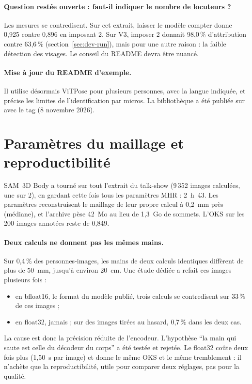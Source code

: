 \documentclass[11pt,a4paper]{report}
\newcommand{\code}[1]{\texttt{\detokenize{#1}}}
\begin{document}
\paragraph{Question restée ouverte : faut-il indiquer le nombre de locuteurs ?} Les mesures se contredisent. Sur cet extrait,
laisser le modèle compter donne 0,925 contre 0,896 en imposant 2. Sur V3, imposer 2 donnait 98,0\,\% d'attribution contre
63,6\,\% (section~\ref{sec:dev-run}), mais pour une autre raison : la faible détection des visages. Le conseil du
README devra être nuancé.

\paragraph{Mise à jour du README d'exemple.} Il utilise désormais ViTPose pour plusieurs personnes, \code{large-v3-turbo} avec
la langue indiquée, et précise les limites de l'identification par micros. La bibliothèque a été publiée sur \code{main} avec
le tag \code{tm-v1-optimisations} (8 novembre 2026).

\section{Paramètres du maillage et reproductibilité}
\label{sec:res-params}

SAM~3D Body a tourné sur tout l'extrait du talk-show (9\,352 images calculées, une sur 2), en gardant cette fois tous les
paramètres MHR : 2~h~43. Les paramètres reconstruisent le maillage de leur propre calcul à 0,2~mm près (médiane), et l'archive pèse
42~Mo au lieu de 1,3~Go de sommets. L'OKS sur les 200 images annotées reste de 0,849.

\paragraph{Deux calculs ne donnent pas les mêmes mains.} Sur 0,4\,\% des personnes-images, les mains de deux calculs identiques
diffèrent de plus de 50~mm, jusqu'à environ 20~cm. Une étude dédiée a refait ces images plusieurs fois :
\begin{itemize}
    \item en bfloat16, le format du modèle publié, trois calculs se contredisent sur 33\,\% de ces images ;
    \item en float32, jamais ; sur des images tirées au hasard, 0,7\,\% dans les deux cas.
\end{itemize}
La cause est donc la précision réduite de l'encodeur. L'hypothèse \enquote{la main qui saute est celle du décodeur du corps} a été
testée et rejetée. Le float32 coûte deux fois plus (1,50~s par image) et donne le même OKS et le même tremblement : il n'achète que
la reproductibilité, utile pour comparer deux réglages, pas pour la qualité.
\end{document}
